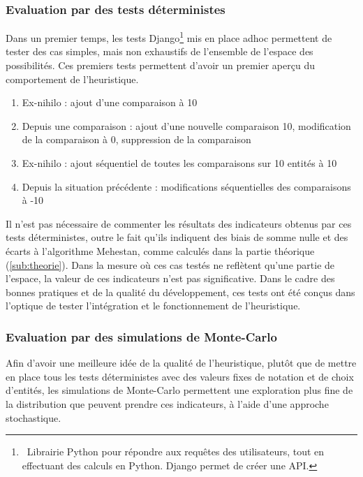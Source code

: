 \subsubsection{Evaluation par des tests déterministes}

Dans un premier temps, les tests Django\footnote{~Librairie Python pour répondre aux requêtes des utilisateurs, tout en effectuant des calculs en Python. Django permet de créer une API.} mis en place adhoc permettent de tester des cas simples, mais non exhaustifs de l'ensemble de l'espace des possibilités. Ces premiers tests permettent d'avoir un premier aperçu du comportement de l'heuristique.

\begin{enumerate}
    \item Ex-nihilo : ajout d'une comparaison à 10
    \item Depuis une comparaison : ajout d'une nouvelle comparaison 10, modification de la comparaison à 0, suppression de la comparaison
    \item Ex-nihilo : ajout séquentiel de toutes les comparaisons sur 10 entités à 10
    \item Depuis la situation précédente : modifications séquentielles des comparaisons à -10
\end{enumerate}

Il n'est pas nécessaire de commenter les résultats des indicateurs obtenus par ces tests déterministes, outre le fait qu'ils indiquent des biais de somme nulle et des écarts à l'algorithme Mehestan, comme calculés dans la partie théorique (\ref{sub:theorie}). Dans la mesure où ces cas testés ne reflètent qu'une partie de l'espace, la valeur de ces indicateurs n'est pas significative. Dans le cadre des bonnes pratiques et de la qualité du développement, ces tests ont été conçus dans l'optique de tester l'intégration et le fonctionnement de l'heuristique.


\subsubsection{Evaluation par des simulations de Monte-Carlo}

Afin d'avoir une meilleure idée de la qualité de l'heuristique, plutôt que de mettre en place tous les tests déterministes avec des valeurs fixes de notation et de choix d'entités, les simulations de Monte-Carlo permettent une exploration plus fine de la distribution que peuvent prendre ces indicateurs, à l'aide d'une approche stochastique.


